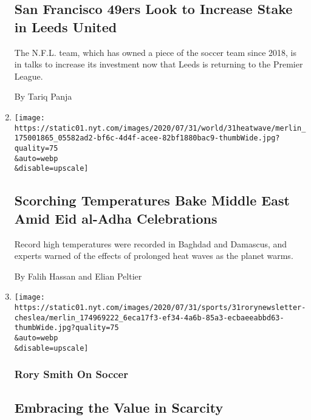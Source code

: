 \begin{enumerate}
  \hypertarget{san-francisco-49ers-look-to-increase-stake-in-leeds-united}{%
  \subsection{San Francisco 49ers Look to Increase Stake in Leeds
  United}\label{san-francisco-49ers-look-to-increase-stake-in-leeds-united}}

  The N.F.L. team, which has owned a piece of the soccer team since
  2018, is in talks to increase its investment now that Leeds is
  returning to the Premier League.

  By Tariq Panja
\item
  \href{/2020/07/31/world/middleeast/Middle-East-heat-wave.html}{}

  \texttt{[image: https://static01.nyt.com/images/2020/07/31/world/31heatwave/merlin\_175001865\_05582ad2-bf6c-4d4f-acee-82bf1880bac9-thumbWide.jpg?quality=75\\\&auto=webp\\\&disable=upscale]}

  \hypertarget{scorching-temperatures-bake-middle-east-amid-eid-al-adha-celebrations}{%
  \subsection{Scorching Temperatures Bake Middle East Amid Eid al-Adha
  Celebrations}\label{scorching-temperatures-bake-middle-east-amid-eid-al-adha-celebrations}}

  Record high temperatures were recorded in Baghdad and Damascus, and
  experts warned of the effects of prolonged heat waves as the planet
  warms.

  By Falih Hassan and Elian Peltier
\item
  \href{/2020/07/31/sports/soccer/soccer-baseball.html}{}

  \texttt{[image: https://static01.nyt.com/images/2020/07/31/sports/31rorynewsletter-cheslea/merlin\_174969222\_6eca17f3-ef34-4a6b-85a3-ecbaeeabbd63-thumbWide.jpg?quality=75\\\&auto=webp\\\&disable=upscale]}

  \hypertarget{rory-smith-on-soccer}{%
  \subsubsection{Rory Smith On Soccer}\label{rory-smith-on-soccer}}

  \hypertarget{embracing-the-value-in-scarcity}{%
  \subsection{Embracing the Value in
  Scarcity}\label{embracing-the-value-in-scarcity}}


\end{enumerate}
